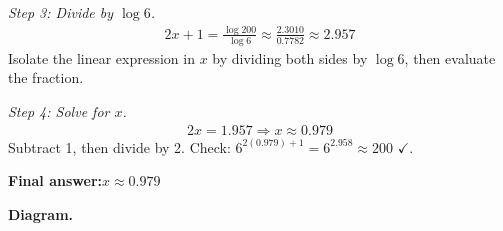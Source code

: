 \documentclass[11pt]{article}
\begin{document}
\textit{Step 3: Divide by \( \log 6 \).}
\[\begin{gathered}
2x + 1 = \frac{\log 200}{\log 6} \approx \frac{2.3010}{0.7782} \approx 2.957
\end{gathered}\]
Isolate the linear expression in \( x \) by dividing both sides by \( \log 6 \), then evaluate the fraction.

\textit{Step 4: Solve for \( x \).}
\[\begin{gathered}
2x = 1.957 \Rightarrow x \approx 0.979
\end{gathered}\]
Subtract 1, then divide by 2. Check: \( 6^{2(0.979)+1} = 6^{2.958} \approx 200 \) $\checkmark$.

\begin{answerbox}
\textbf{Final answer:}\quad \(\displaystyle  x \approx 0.979 \)
\end{answerbox}
\textbf{Diagram.}
\end{document}
